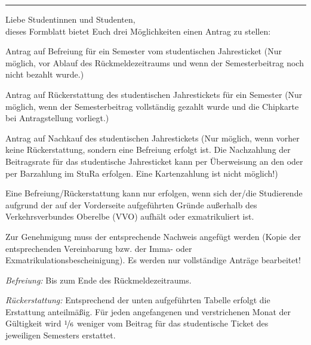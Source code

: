 \documentclass[%
	ngerman,	%
	parskip=half,
	paper=a4,%
	pagesize=auto	%
	]{scrartcl}
\begin{document}
\vfill

\hrule
Liebe Studentinnen und Studenten,\\
dieses Formblatt bietet Euch drei Möglichkeiten einen Antrag zu stellen:
\footnotesize
\begin{compactenum}
\item	Antrag auf Befreiung für ein Semester vom studentischen Jahresticket
	(Nur möglich, vor Ablauf des Rückmeldezeitraums und wenn der
	Semesterbeitrag noch nicht bezahlt wurde.)

\item	Antrag auf Rückerstattung des studentischen Jahrestickets für ein
	Semester (Nur möglich, wenn der Semesterbeitrag vollständig gezahlt
	wurde und die Chipkarte bei Antragstellung vorliegt.)

\item	Antrag auf Nachkauf des studentischen Jahrestickets (Nur möglich, wenn
	vorher keine Rückerstattung, sondern eine Befreiung erfolgt ist. Die
	Nachzahlung der Beitragsrate für das studentische Jahresticket kann per
	Überweisung an den oder per Barzahlung im StuRa erfolgen. Eine
	Kartenzahlung ist nicht möglich!)
\end{compactenum}

Eine Befreiung/Rückerstattung kann nur erfolgen, wenn sich der/die Studierende
aufgrund der auf der Vorderseite aufgeführten Gründe außerhalb des
Verkehrsverbundes Oberelbe (VVO) aufhält oder exmatrikuliert ist.

Zur Genehmigung muss der entsprechende Nachweis angefügt werden (Kopie der
entsprechenden Vereinbarung bzw. der Imma- oder Exmatrikulationsbescheinigung).
Es werden nur vollständige Anträge bearbeitet!

\begin{compactitem}
\item[\emph{Befreiung:}]
	Bis zum Ende des Rückmeldezeitraums.
\item[\emph{Rückerstattung:}]
	Entsprechend der unten aufgeführten Tabelle erfolgt die Erstattung
	anteilmäßig. Für jeden angefangenen und verstrichenen Monat der
	Gültigkeit wird $\nicefrac{1}{6}$ weniger vom Beitrag für das
	studentische Ticket des jeweiligen Semesters erstattet.
\end{compactitem}
\end{document}
